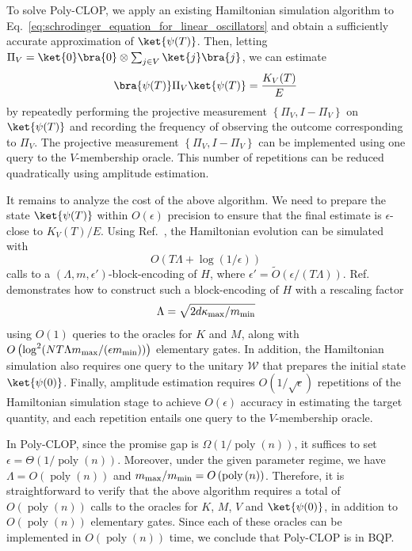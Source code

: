 \documentclass[superscriptaddress,onecolumn,nofootinbib,longbibliography,a4paper,accepted=2026-09-29]{quantumarticle}
\theoremstyle{plain}
\theoremstyle{definition}
\numberwithin{thm}{section}
\numberwithin{assumption}{section}
\numberwithin{lemma}{section}
\numberwithin{prop}{section}
\numberwithin{cor}{section}
\numberwithin{definition}{section}
\numberwithin{rmk}{section}
\numberwithin{equation}{section}
\newcommand{\lrb}[1]{\left ( #1 \right )}
\newcommand{\lrcb}[1]{\left \{ #1 \right \}}
\newcommand{\mypoly}[1]{\operatorname{poly} \lrb{#1}}
\newcommand{\myO}[1]{O\lrb{#1}}
\newcommand{\mytO}[1]{\tilde{O}\lrb{#1}}
\newcommand{\myOmega}[1]{\Omega\lrb{#1}}
\newcommand{\myTheta}[1]{\Theta\lrb{#1}}
\begin{document}
To solve Poly-CLOP, we apply an existing Hamiltonian simulation algorithm to Eq.~\eqref{eq:schrodinger_equation_for_linear_oscillators} and obtain a sufficiently accurate approximation of $\ket{\psi(T)}$. Then, letting $\Pi_V= \ket{0}\bra{0}\otimes \sum_{j \in V} \ket{j}\bra{j}$, we can estimate
\begin{align}
   \bra{\psi(T)} \Pi_V \ket{\psi(T)} =  \frac{K_V(T)}{E}
\end{align}
by repeatedly performing the projective measurement
$\lrcb{\Pi_V, I-\Pi_V}$ on $\ket{\psi(T)}$ and recording the frequency of observing the outcome corresponding to $\Pi_V$. The projective measurement $\lrcb{\Pi_V, I - \Pi_V}$ can be implemented using one query to the $V$-membership oracle. This number of repetitions can be reduced quadratically using amplitude estimation.

It remains to analyze the cost of the above algorithm. We need to prepare the state $\ket{\psi(T)}$ within $\myO{\epsilon}$ precision to ensure that the final estimate is $\epsilon$-close to $K_V(T)/E$. Using Ref.~\cite{low2017optimal}, the Hamiltonian evolution can be simulated with 
$$\myO{T\Lambda + \log(1/\epsilon)}$$ calls to a $(\Lambda, m, \epsilon')$-block-encoding of $H$, where $\epsilon' = \mytO{\epsilon / (T\Lambda)}$. Ref.~\cite{babbush2023exponential} demonstrates how to construct such a block-encoding of $H$ with a rescaling factor 
\begin{align}
\Lambda = \sqrt{2d\kappa_{\rm max}/m_{\rm min}}    
\end{align}
using $\myO{1}$ queries to the oracles for $K$ and $M$, along with $\myO{\log^2(N T\Lambda m_{\rm max} / (\epsilon m_{\rm min}))}$ elementary gates. In addition, the Hamiltonian simulation also requires one query to the unitary $\mathcal{W}$ that prepares the initial state $\ket{\psi(0)}$. Finally, amplitude estimation requires $\myO{1/\sqrt{\epsilon}}$ repetitions of the Hamiltonian simulation stage to achieve $\myO{\epsilon}$ accuracy in estimating the target quantity, and each repetition entails one query to the $V$-membership oracle. 

In Poly-CLOP, since the promise gap is $\myOmega{1/\mypoly{n}}$, it suffices to set $\epsilon = \myTheta{1/\mypoly{n}}$. Moreover, under the given parameter regime, we have $\Lambda = \myO{\mypoly{n}}$ and $m_{\rm max}/m_{\rm min}=\myO{\mypoly{n}}$. Therefore, it is straightforward to verify that the above algorithm requires a total of $\myO{\mypoly{n}}$ calls to the oracles for $K$, $M$, $V$ and  $\ket{\psi(0)}$, in addition to $\myO{\mypoly{n}}$ elementary gates. Since each of these oracles can be implemented in $\myO{\mypoly{n}}$ time, we conclude that Poly-CLOP is in BQP.
\end{document}
